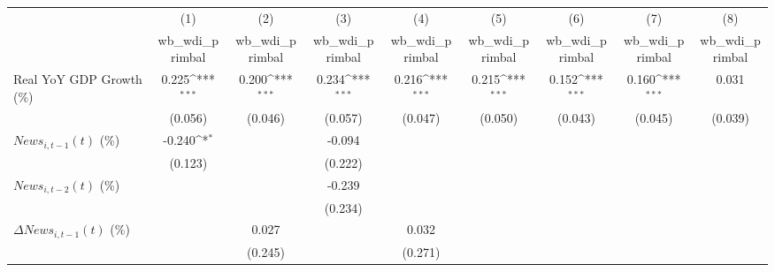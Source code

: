 {
\def\sym#1{\ifmmode^{#1}\else\(^{#1}\)\fi}
\begin{tabular}{l*{8}{c}}
\toprule
                    &\multicolumn{1}{c}{(1)}&\multicolumn{1}{c}{(2)}&\multicolumn{1}{c}{(3)}&\multicolumn{1}{c}{(4)}&\multicolumn{1}{c}{(5)}&\multicolumn{1}{c}{(6)}&\multicolumn{1}{c}{(7)}&\multicolumn{1}{c}{(8)}\\
                    &\multicolumn{1}{c}{wb_wdi_primbal}&\multicolumn{1}{c}{wb_wdi_primbal}&\multicolumn{1}{c}{wb_wdi_primbal}&\multicolumn{1}{c}{wb_wdi_primbal}&\multicolumn{1}{c}{wb_wdi_primbal}&\multicolumn{1}{c}{wb_wdi_primbal}&\multicolumn{1}{c}{wb_wdi_primbal}&\multicolumn{1}{c}{wb_wdi_primbal}\\
\midrule
Real YoY GDP Growth (\%)&       0.225\sym{***}&       0.200\sym{***}&       0.234\sym{***}&       0.216\sym{***}&       0.215\sym{***}&       0.152\sym{***}&       0.160\sym{***}&       0.031         \\
                    &     (0.056)         &     (0.046)         &     (0.057)         &     (0.047)         &     (0.050)         &     (0.043)         &     (0.045)         &     (0.039)         \\
\addlinespace
$ News_{i,t-1}(t)$ (\%)&      -0.240\sym{*}  &                     &      -0.094         &                     &                     &                     &                     &                     \\
                    &     (0.123)         &                     &     (0.222)         &                     &                     &                     &                     &                     \\
\addlinespace
$ News_{i,t-2}(t)$ (\%)&                     &                     &      -0.239         &                     &                     &                     &                     &                     \\
                    &                     &                     &     (0.234)         &                     &                     &                     &                     &                     \\
\addlinespace
$ \Delta News_{i,t-1}(t)$ (\%)&                     &       0.027         &                     &       0.032         &                     &                     &                     &                     \\
                    &                     &     (0.245)         &                     &     (0.271)         &                     &                     &                     &                     \\

\end{tabular}}
